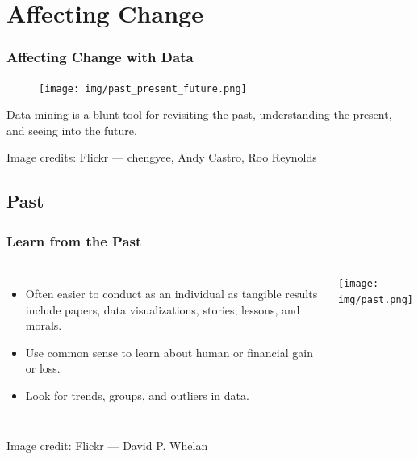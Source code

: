 \documentclass[11pt,
               aspectratio=169
               ]{beamer}
\begin{document}
	\section{Affecting Change}
	
		\begin{frame}[t]
		
			\frametitle{Affecting Change with Data}
		
			\vspace{-10pt}
		
			\begin{figure}[htb]
				\begin{center}
					\texttt{[image: img/past\_present\_future.png]}
					\label{fig:pat_present_future}

				\end{center}
			\end{figure}
		
			\vspace{-20pt}
		
			Data mining is a blunt tool for revisiting the past, understanding the present, and seeing into the future.
			
			\vspace{10pt}
			
			\tiny Image credits: Flickr --- chengyee, Andy Castro, Roo Reynolds
			
		
		\end{frame}
	
	\subsection{Past}
		
		\begin{frame}
		
			\frametitle{Learn from the Past}
		
			\begin{columns}
				
				\vspace{-15pt}
				\begin{itemize}
					\item Often easier to conduct as an individual as tangible results include papers, data visualizations, stories, lessons, and morals.
					\item Use common sense to learn about human or financial gain or loss.
					\item Look for trends, groups, and outliers in data.
				\end{itemize}

				\centering
				\texttt{[image: img/past.png]}
				
				
	
			\end{columns}
		
			\tiny Image credit: Flickr --- David P. Whelan
		
		\end{frame}
\end{document}
